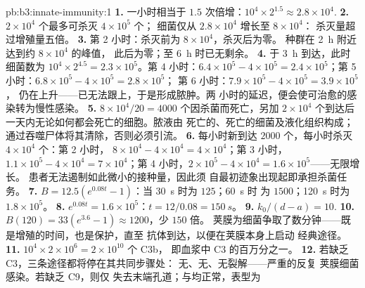 \begin{solution}{pb:b3:innate-immunity:1}
\textbf{1.} 一小时相当于 $1.5$ 次倍增：$10^{4}\times 2^{1.5} \approx
2.8\times 10^{4}$.
\textbf{2.} $2\times 10^{4}$ 个最多可杀灭 $4\times 10^{5}$ 个；
细菌仅从 $2.8\times 10^{4}$ 增长至 $8\times 10^{4}$：
杀灭量超过增殖量五倍。
\textbf{3.} 第 2 小时：杀灭前为 $8\times 10^{4}$，杀灭后为零。
种群在 \qty{2}{h} 附近达到约 $8\times 10^{4}$ 的峰值，
此后为零；至 \qty{6}{h} 时已无剩余。
\textbf{4.} 于 \qty{3}{h} 到达，此时细菌数为 $10^{4}\times 2^{4.5} = 2.3\times
10^{5}$。第 4 小时：$6.4\times 10^{5} - 4\times 10^{5} = 2.4\times
10^{5}$；第 5 小时：$6.8\times 10^{5} - 4\times 10^{5} = 2.8\times 10^{5}$；
第 6 小时：$7.9\times 10^{5} - 4\times 10^{5} = 3.9\times 10^{5}$，
仍在上升——已无法跟上，于是形成脓肿。两
小时的延迟，便会使可治愈的感染转为慢性感染。
\textbf{5.} $8\times 10^{4}/20 = 4000$ 个因杀菌而死亡，另加
$2\times 10^{4}$ 个到达后一天内无论如何都会死亡的细胞。脓液由
死亡的、死亡的细菌及液化组织构成；
通过吞噬尸体将其清除，否则必须引流。
\textbf{6.} 每小时新到达 $2000$ 个，每小时杀灭 $4\times 10^{4}$ 个：第 2 小时，
$8\times 10^{4} - 4\times 10^{4} = 4\times 10^{4}$；第 3 小时，$1.1\times
10^{5} - 4\times 10^{4} = 7\times 10^{4}$；第 4 小时，$2\times 10^{5} -
4\times 10^{4} = 1.6\times 10^{5}$——无限增长。
患者无法遏制如此微小的接种量，因此须
自最初迹象出现起即承担杀菌任务。
\textbf{7.} $B = 12.5(e^{0.08t} - 1)$：当 \qty{30}{s} 时为 $125$；\qty{60}{s} 时
为 $1500$；\qty{120}{s} 时为 $1.8\times 10^{5}$。
\textbf{8.} $e^{0.08t} = 1.6\times 10^{5}$：$t = 12/0.08 = \qty{150}{s}$。
\textbf{9.} $k_{0}/(d - a) = 10$.
\textbf{10.} $B(120) = 33(e^{3.6} - 1) \approx 1200$，少 $150$ 倍。
荚膜为细菌争取了数分钟——既是增殖的时间，也是保护，直至
抗体到达，以便在荚膜本身上启动
经典途径。
\textbf{11.} $10^{4}\times 2\times 10^{6} = 2\times 10^{10}$ 个 C3b，
即血浆中 C3 的百万分之一。
\textbf{12.} 若缺乏 C3，三条途径都将停在其共同步骤处：
无、无、无裂解——严重的反复
荚膜细菌感染。若缺乏 C9，则仅
失去末端孔道；与均正常，表型为

\end{solution}
